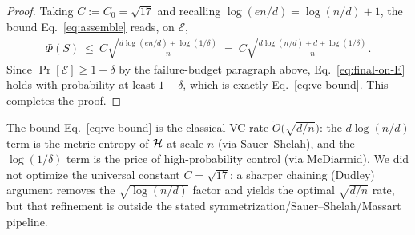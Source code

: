 \begin{proof}
Taking $C:=C_0=\sqrt{17}$ and recalling $\log(en/d)=\log(n/d)+1$, the bound
Eq.~\eqref{eq:assemble} reads, on $\mathcal{E}$,
\begin{align}\label{eq:final-on-E}
\Phi(S)
\ \le\ C\sqrt{\frac{d\log(en/d)+\log(1/\delta)}{n}}
\ =\ C\sqrt{\frac{d\log(n/d)+d+\log(1/\delta)}{n}}.
\end{align}
Since $\Pr[\mathcal{E}]\ge1-\delta$ by the failure-budget paragraph above,
Eq.~\eqref{eq:final-on-E} holds with probability at least $1-\delta$, which is
exactly Eq.~\eqref{eq:vc-bound}. This completes the proof.
\end{proof}

\begin{remark}\label{rem:rate}
The bound Eq.~\eqref{eq:vc-bound} is the classical VC rate
$\widetilde O\bigl(\sqrt{d/n}\bigr)$: the $d\log(n/d)$ term is the metric
entropy of $\mathcal{H}$ at scale $n$ (via Sauer--Shelah), and the $\log(1/\delta)$
term is the price of high-probability control (via McDiarmid). We did not
optimize the universal constant $C=\sqrt{17}$; a sharper chaining (Dudley) argument
removes the $\sqrt{\log(n/d)}$ factor and yields the optimal $\sqrt{d/n}$ rate,
but that refinement is outside the stated symmetrization/Sauer--Shelah/Massart
pipeline.
\end{remark}

